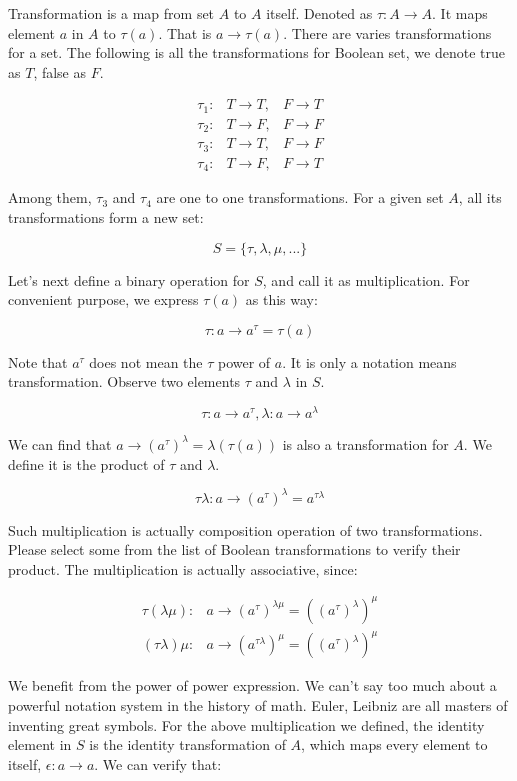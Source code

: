 \documentclass{article}
\begin{document}
Transformation is a map from set $A$ to $A$ itself. Denoted as $\tau : A \to A$. It maps element $a$ in $A$ to $\tau(a)$. That is $a \to \tau(a)$. There are varies transformations for a set. The following is all the transformations for Boolean set, we denote true as $T$, false as $F$.

\[
\begin{array}{rll}
\tau_1 : & T \to T, & F \to T \\
\tau_2 : & T \to F, & F \to F \\
\tau_3 : & T \to T, & F \to F \\
\tau_4 : & T \to F, & F \to T
\end{array}
\]

Among them, $\tau_3$ and $\tau_4$ are one to one transformations. For a given set $A$, all its transformations form a new set:

\[
S = \{\tau, \lambda, \mu, ...\}
\]

Let's next define a binary operation for $S$, and call it as multiplication. For convenient purpose, we express $\tau(a)$ as this way:

\[
\tau: a \to a^\tau = \tau(a)
\]

Note that $a^\tau$ does not mean the $\tau$ power of $a$. It is only a notation means transformation. Observe two elements $\tau$ and $\lambda$ in $S$.

\[
\tau: a \to a^\tau,  \lambda: a \to a^\lambda
\]

We can find that $a \to (a^\tau)^\lambda = \lambda(\tau(a))$ is also a transformation for $A$. We define it is the product of $\tau$ and $\lambda$.

\[
\tau\lambda: a \to (a^\tau)^\lambda = a^{\tau\lambda}
\]

Such multiplication is actually composition operation of two transformations. Please select some from the list of Boolean transformations to verify their product. The multiplication is actually associative, since:

\[
\begin{array}{rl}
\tau(\lambda\mu): & a \to (a^\tau)^{\lambda\mu} = ((a^\tau)^\lambda)^\mu \\
(\tau\lambda)\mu: & a \to (a^{\tau\lambda})^\mu = ((a^\tau)^\lambda)^\mu
\end{array}
\]

We benefit from the power of power expression. We can't say too much about a powerful notation system in the history of math. Euler, Leibniz are all masters of inventing great symbols. For the above multiplication we defined, the identity element in $S$ is the identity transformation of $A$, which maps every element to itself, $\epsilon: a \to a$. We can verify that:
\end{document}
